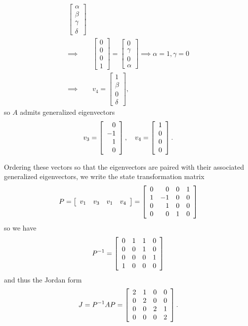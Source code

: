 \documentclass{article}
\begin{document}
\begin{align*}
\left[\begin{array}{c}
\alpha \\ \beta \\ \gamma \\ \delta
\end{array}\right] \\
\implies &
\left[\begin{array}{c}
0 \\ 0 \\ 0 \\ 1
\end{array}\right]
= \left[\begin{array}{c}
  0 \\ \gamma \\ 0 \\ \alpha
\end{array}\right]
\implies \alpha = 1, \gamma = 0 \\
\implies &
v_4 = \left[\begin{array}{c}
1 \\ \beta \\ 0 \\ \delta
\end{array}\right],
\end{align*}
so $A$ admits generalized eigenvectors
$$
v_3 = \left[\begin{array}{r r}
0 \\ -1 \\ 1 \\ 0
\end{array}\right], \quad
v_4 = \left[\begin{array}{c c}
1 \\ 0 \\ 0 \\ 0
\end{array}\right].
$$

Ordering these vectors so that the eigenvectors are paired with their
associated generalized eigenvectors, we write the state transformation matrix
$$
P 
= \left[\begin{array}{r r r r}
v_1 & v_3 & v_1 & v_4
\end{array}\right]
= \left[\begin{array}{r r r r}
0 &  0 & 0 & 1 \\
1 & -1 & 0 & 0 \\
0 &  1 & 0 & 0 \\
0 &  0 & 1 & 0
\end{array}\right]
$$
so we have
$$
P^{-1} = \left[\begin{array}{c c c c}
0 & 1 & 1 & 0 \\
0 & 0 & 1 & 0 \\
0 & 0 & 0 & 1 \\
1 & 0 & 0 & 0
\end{array}\right]
$$
and thus the Jordan form
$$
J = P^{-1} A P
  = \left[\begin{array}{c c c c}
      2 & 1 & 0 & 0 \\
      0 & 2 & 0 & 0 \\
      0 & 0 & 2 & 1 \\
      0 & 0 & 0 & 2
    \end{array}\right].
$$
\end{document}
